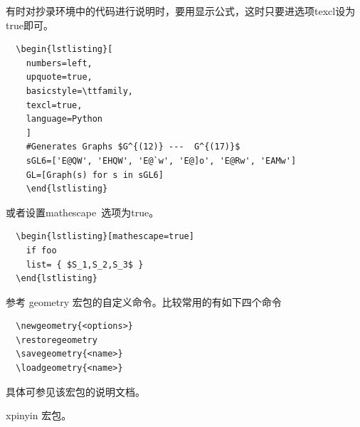 
有时对抄录环境中的代码进行说明时，要用显示公式，这时只要进选项texcl设为true即可。

\begin{verbatim}
  \begin{lstlisting}[
    numbers=left,
    upquote=true,
    basicstyle=\ttfamily,
    texcl=true,
    language=Python
    ]
    #Generates Graphs $G^{(12)} ---  G^{(17)}$
    sGL6=['E@QW', 'EHQW', 'E@`w', 'E@]o', 'E@Rw', 'EAMw']
    GL=[Graph(s) for s in sGL6]
    \end{lstlisting}
\end{verbatim}
%  
%  

或者设置mathescape~选项为true。

\begin{verbatim}
  \begin{lstlisting}[mathescape=true]
    if foo
    list= { $S_1,S_2,S_3$ }
  \end{lstlisting}
\end{verbatim}





参考 geometry 宏包的自定义命令。比较常用的有如下四个命令
\begin{verbatim}
  \newgeometry{<options>}
  \restoregeometry
  \savegeometry{<name>}
  \loadgeometry{<name>}
\end{verbatim}
具体可参见该宏包的说明文档。



xpinyin 宏包。









